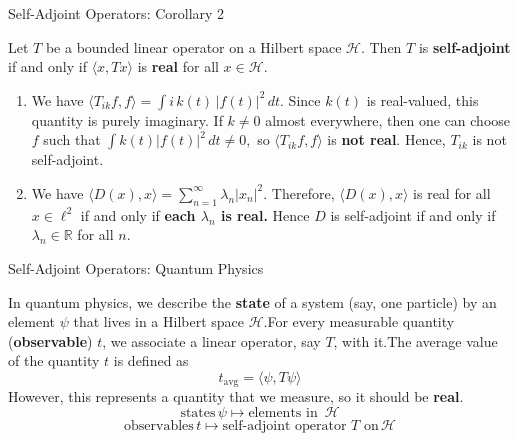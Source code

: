 \documentclass[9pt, aspectratio=169]{beamer}
\begin{document}
\begin{frame}{Self-Adjoint Operators: Corollary 2}
\begin{tcolorbox}[colback=blue!5, colframe=blue!50!red, title=Corollary 2]
Let $T$ be a bounded linear operator on a  Hilbert space $\mathcal{H}$. Then $T$ is \textbf{self-adjoint} if and only if $\langle x,Tx\rangle$ is \textbf{real} for all $x\in\mathcal{H}$.
\end{tcolorbox}
\pause
\pause
\begin{enumerate}
    \item We have
    $
    \langle T_{ik}f,f\rangle=\int i\,k(t)\,|f(t)|^2\,dt.
    $
    Since $k(t)$ is real-valued, this quantity is purely imaginary. If $k\neq 0$ almost everywhere, then one can choose $f$ such that
    $
    \int k(t)|f(t)|^2\,dt\neq 0,
    $
    so $\langle T_{ik}f,f\rangle$ is \textbf{not real}. Hence, $T_{ik}$ is not self-adjoint.
\pause
    \item We have
    $
    \langle D(x),x\rangle=\sum_{n=1}^\infty \lambda_n |x_n|^2.
    $
    Therefore, $\langle D(x),x\rangle$ is real for all $x\in\ell^2$ if and only if \textbf{each $\lambda_n$ is real.} Hence $D$ is self-adjoint if and only if $\lambda_n\in\mathbb R$ for all $n$.
\end{enumerate}
\end{frame}
\begin{frame}{Self-Adjoint Operators: Quantum Physics}
    
     \begin{tcolorbox}[colback=!5, colframe=red!60!black, title= Quantum Physics]
In quantum physics, we describe the \textbf{state} of a system (say, one particle) by an element $\psi$ that lives in a Hilbert space $\mathcal{H}$.\pause For every measurable quantity (\textbf{observable}) $t$, we associate a linear operator, say $T$, with it.\pause The average value of the quantity $t$ is defined as
$$t_{\mathrm{avg}}=\langle\psi,T\psi \rangle$$
 \pause However, this represents a quantity that we measure, so it should be \textbf{real}.
$$\text{states} \, \psi \longmapsto \text{elements in } \, \mathcal{H}$$
$$\text{observables} \, t \longmapsto \text{self-adjoint operator $T$ on} \, \mathcal{H}$$
\end{tcolorbox} 

\end{frame}
\end{document}
